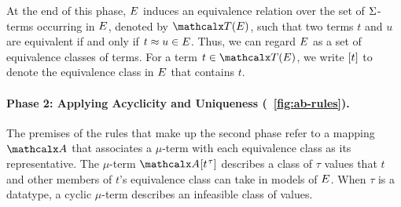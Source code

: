 At the end of this phase, $E$ induces an equivalence
relation over the set of $\mathrm{\Sigma}$-terms occurring in $E$,
denoted by $\tEc$, such that two terms $t$ and $u$ are equivalent if and
only if $t \approx u \in E$.
Thus, we can regard $E$ as a set of
equivalence classes of terms. For a term $t \in \tEc$, we write $[t]$ to
denote the equivalence class in $E$ that contains $t$.

\paragraph{Phase 2: Applying Acyclicity and Uniqueness \rm(\figurename~\ref{fig:ab-rules}).}
The premises of the rules that make up the second phase refer to a mapping $\Val$
that associates a $\mu$-term with each equivalence class as its representative.
The $\mu$-term $\Val[t\typ{\tau}]$ describes a class of $\tau$ values
that $t$ and other members of $t$'s equivalence class can take in models of $E$.
When $\tau$ is a datatype, %
a cyclic $\mu$-term describes an infeasible class of values.

